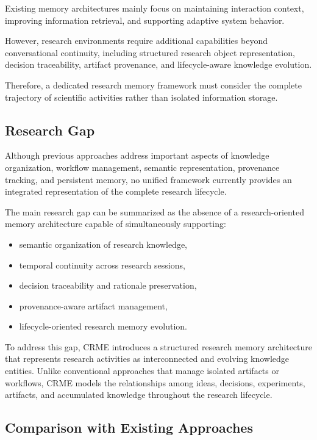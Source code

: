 Existing memory architectures mainly focus on maintaining interaction context, improving information retrieval, and supporting adaptive system behavior.

However, research environments require additional capabilities beyond conversational continuity, including structured research object representation, decision traceability, artifact provenance, and lifecycle-aware knowledge evolution.

Therefore, a dedicated research memory framework must consider the complete trajectory of scientific activities rather than isolated information storage.


\subsection{Research Gap}

Although previous approaches address important aspects of knowledge organization, workflow management, semantic representation, provenance tracking, and persistent memory, no unified framework currently provides an integrated representation of the complete research lifecycle.

The main research gap can be summarized as the absence of a research-oriented memory architecture capable of simultaneously supporting:

\begin{itemize}
    \item semantic organization of research knowledge,
    \item temporal continuity across research sessions,
    \item decision traceability and rationale preservation,
    \item provenance-aware artifact management,
    \item lifecycle-oriented research memory evolution.
\end{itemize}

To address this gap, CRME introduces a structured research memory architecture that represents research activities as interconnected and evolving knowledge entities. Unlike conventional approaches that manage isolated artifacts or workflows, CRME models the relationships among ideas, decisions, experiments, artifacts, and accumulated knowledge throughout the research lifecycle.


\subsection{Comparison with Existing Approaches}

